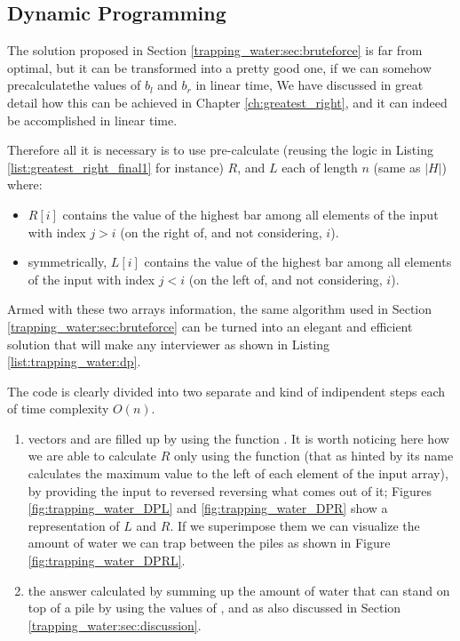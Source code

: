 \subsection{Dynamic Programming}
\label{trapping_water:sec:dp}
The solution proposed in Section \ref{trapping_water:sec:bruteforce} is far from optimal, but it can be transformed into a pretty good one, if we can somehow precalculatethe values of $b_l$ and $b_r$ in linear time,
We have discussed in great detail how this can be achieved in Chapter \ref{ch:greatest_right}, and it can indeed be accomplished in linear time. 

Therefore all it is necessary is to use pre-calculate (reusing the logic in Listing \ref{list:greatest_right_final1} for instance) $R$, and $L$ each of length $n$ (same as $|H|$) where: 
\begin{itemize}
	\item $R[i]$ contains the value of the highest bar among all elements of the input with index $j > i$ (on the right of, and not considering, $i$).
	\item symmetrically, $L[i]$ contains the value of the highest bar among all elements of the input with index $j < i$ (on the left of, and not considering, $i$).
\end{itemize}

Armed with these two arrays information, the same algorithm used in Section \ref{trapping_water:sec:bruteforce} can be turned into an elegant and efficient solution that will make any interviewer as shown in 
Listing \ref{list:trapping_water:dp}.



The code is clearly divided into two separate and kind of indipendent steps each of time complexity $O(n)$. 
\begin{enumerate}
	\item vectors  and  are filled up by using the function . It is worth noticing here how we are able to calculate $R$ only using the function  (that as hinted by its name calculates the maximum value to the left of each element of the input array), by providing the input to  reversed reversing what comes out of it; Figures \ref{fig:trapping_water_DPL} and \ref{fig:trapping_water_DPR} show a representation of $L$ and $R$. If we superimpose them we can visualize the amount of water we can trap between the piles as shown in  Figure 
	\ref{fig:trapping_water_DPRL}.
	\item the answer calculated by summing up the amount of water that can stand on top of a pile by using the values of  ,  and  as also discussed in Section \ref{trapping_water:sec:discussion}.
\end{enumerate}

